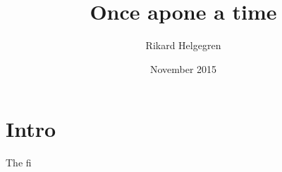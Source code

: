 \documentclass{article}
\title{Once apone a time}
\author{Rikard Helgegren}
\date{November 2015}
\begin{document}
\maketitle
\tableofcontents 
\newpage
\section{Intro}

The fi
\end{document}
